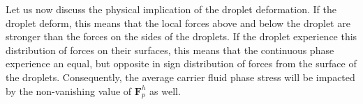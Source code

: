 Let us now discuss the physical implication of the droplet deformation. 
If the droplet deform, this means that the local forces above and below the droplet are stronger than the forces on the sides of the droplets. 
If the droplet experience this distribution of forces on their surfaces, this means that the continuous phase experience an equal, but opposite in sign distribution of forces from the surface of the droplets. 
Consequently, the average carrier fluid phase stress will be impacted by the non-vanishing value of $\textbf{F}^h_p$ as well. 




